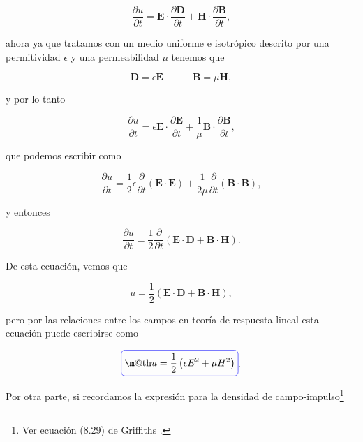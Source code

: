 \documentclass[a4paper,11pt]{article}
\makeatletter
\numberwithin{equation}{section}
\newcommand*{\boxcolor}{blue}
\renewcommand{\boxed}[1]{\textcolor{\boxcolor}{%
\tikz[baseline={([yshift=-1ex]current bounding box.center)}] \node [rectangle, minimum width=1ex,rounded corners,draw] {\normalcolor\m@th$\displaystyle#1$};}}
\makeatother
\begin{document}
\begin{equation}
 \frac{\partial u}{\partial t} = \mathbf{E} \cdot \frac{\partial \mathbf{D}}{\partial 
 t} + \mathbf{H}\cdot\frac{\partial \mathbf{B}}{\partial t},
\end{equation}

ahora ya que tratamos con un medio uniforme e isotrópico descrito por una permitividad 
$\epsilon$ y una permeabilidad $\mu$ tenemos que 

\begin{equation}
 \mathbf{D} = \epsilon\mathbf{E} \qquad \quad \mathbf{B} = \mu\mathbf{H}, 
\end{equation}

y por lo tanto

\begin{equation}
 \frac{\partial u}{\partial t} = \epsilon\mathbf{E} \cdot \frac{\partial \mathbf{E}}{\partial 
 t} + \frac{1}{\mu}\mathbf{B}\cdot\frac{\partial \mathbf{B}}{\partial t},
\end{equation}

que podemos escribir como 

\begin{equation}
  \frac{\partial u}{\partial t} = \frac{1}{2}\epsilon \frac{\partial}{\partial t}
  (\mathbf{E}\cdot \mathbf{E}) + \frac{1}{2\mu} \frac{\partial}{\partial t}
  (\mathbf{B}\cdot \mathbf{B}),
\end{equation}

y entonces 

\begin{equation}
  \frac{\partial u}{\partial t} = \frac{1}{2}\frac{\partial}{\partial t}
  (\mathbf{E}\cdot\mathbf{D} + \mathbf{B}\cdot\mathbf{H}).
\end{equation}

De esta ecuación, vemos que 

\begin{equation}
 u =  \frac{1}{2}
  (\mathbf{E}\cdot\mathbf{D} + \mathbf{B}\cdot\mathbf{H}),
\end{equation}

pero por las relaciones entre los campos en teoría de respuesta lineal esta 
ecuación puede escribirse como 

\begin{equation}
 \boxed{u = \frac{1}{2}\left(\epsilon E^2 + \mu H^2\right)}.
\end{equation}

Por otra parte, si recordamos la expresión para la densidad de campo-impulso\footnote{
Ver ecuación (8.29) de Griffiths \cite{griffiths}.}
\end{document}
